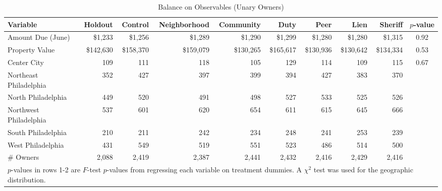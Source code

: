 \documentclass[12pt]{article}
\begin{document}
\begin{sidewaystable}[htbp]
\centering
\caption{Balance on Observables (Unary Owners)}\label{balance}
\vspace{10mm}
\begin{tabular}{lrrrrrrrrc}
\hline \hline Variable & Holdout & Control & Neighborhood & Community
& Duty & Peer & Lien & Sheriff & $p$-value \\ \hline Amount Due (June)
& \$1,233 & \$1,256 & \$1,289 & \$1,290 & \$1,299 & \$1,280 & \$1,280
& \$1,315 & 0.92 \\ Property Value & \$142,630 & \$158,370 & \$159,079
& \$130,265 & \$165,617 & \$130,936 & \$130,642 & \$134,334 & 0.53
\\ \hline Center City & 109 & 111 & 118 & 105 & 129 & 114 & 109 & 115
& 0.67 \\ Northeast Philadelphia & 352 & 427 & 397 & 399 & 394 & 427 &
383 & 370 & \\ North Philadelphia & 449 & 520 & 491 & 498 & 527 & 533
& 525 & 526 & \\ Northwest Philadelphia & 537 & 601 & 620 & 654 & 611
& 615 & 645 & 666 & \\ South Philadelphia & 210 & 211 & 242 & 234 &
248 & 241 & 253 & 239 & \\ West Philadelphia & 431 & 549 & 519 & 551 &
523 & 486 & 514 & 500 & \\ \hline \# Owners & 2,088 & 2,419 & 2,387 &
2,441 & 2,432 & 2,416 & 2,429 & 2,416 & \\ \hline
\multicolumn{10}{l}{\scriptsize{$p$-values in rows 1-2 are $F$-test
    $p$-values from regressing each variable on treatment dummies. A
    $\chi^2$ test was used for the geographic distribution.}} \\
\end{tabular}
\end{sidewaystable}
\end{document}
